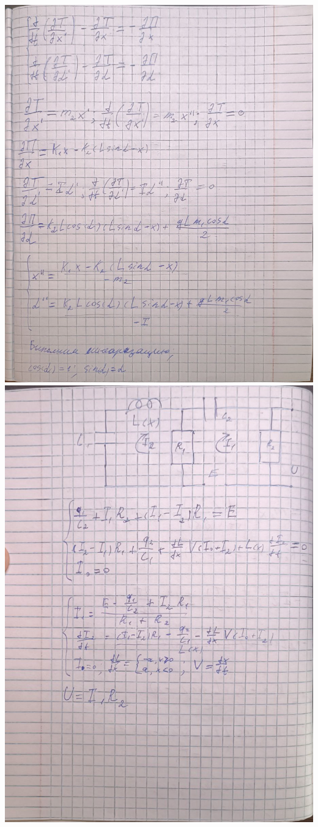 \documentclass[a4paper,14pt]{extarticle}
\begin{document}
\begin{center}
    \includegraphics[width=200mm]{mod2}
    \includegraphics[width=200mm]{mod3}
\end{center}
\end{document}
